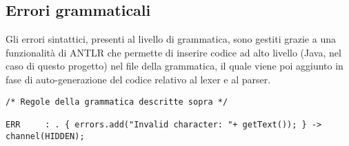 \documentclass[../../main]{subfiles}
\begin{document}
\subsection{Errori grammaticali}
Gli errori sintattici, presenti al livello di grammatica, sono gestiti grazie a una funzionalità di ANTLR che permette
di inserire codice ad alto livello (Java, nel caso di questo progetto) nel file della grammatica, il quale viene poi aggiunto 
in fase di auto-generazione del codice relativo al lexer e al parser.
\begin{lstlisting}[style=antlr]
/* Regole della grammatica descritte sopra */

ERR     : . { errors.add("Invalid character: "+ getText()); } -> channel(HIDDEN);
\end{lstlisting}
\end{document}
